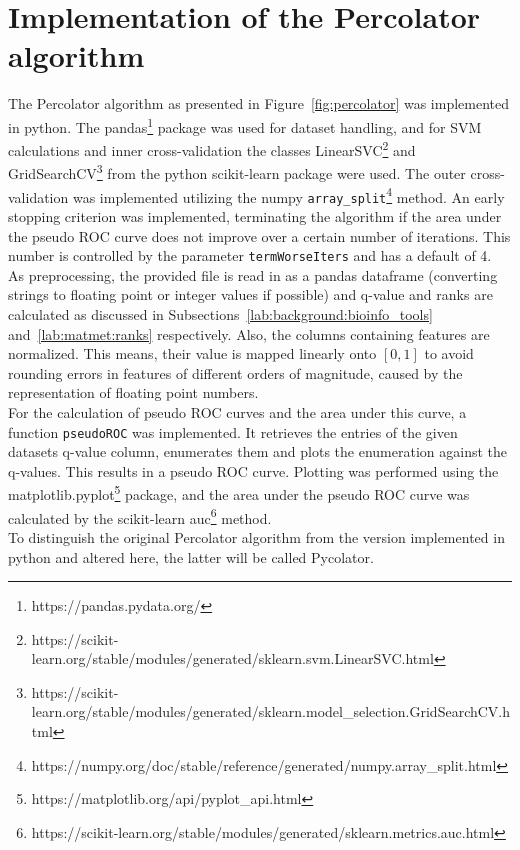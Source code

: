\section{Implementation of the Percolator algorithm}
The Percolator algorithm as presented in Figure~\ref{fig:percolator} was implemented in python. The pandas\footnote{https://pandas.pydata.org/} package was used for dataset handling, and for SVM calculations and inner cross-validation the classes LinearSVC\footnote{https://scikit-learn.org/stable/modules/generated/sklearn.svm.LinearSVC.html} and GridSearchCV\footnote{https://scikit-learn.org/stable/modules/generated/sklearn.model\_selection.GridSearchCV.html} from the python scikit-learn package were used. The outer cross-validation was implemented utilizing the numpy \texttt{array\_split}\footnote{https://numpy.org/doc/stable/reference/generated/numpy.array\_split.html} method. An early stopping criterion was implemented, terminating the algorithm if the area under the pseudo ROC curve does not improve over a certain number of iterations. This number is controlled by the parameter \texttt{termWorseIters} and has a default of 4.\\
\label{lab:matmet:normalization}As preprocessing, the provided file is read in as a pandas dataframe (converting strings to floating point or integer values if possible) and q-value and ranks are calculated as discussed in Subsections~\ref{lab:background:bioinfo_tools} and~\ref{lab:matmet:ranks} respectively. Also, the columns containing features are normalized. This means, their value is mapped linearly onto $[0,1]$ to avoid rounding errors in features of different orders of magnitude, caused by the representation of floating point numbers.\\
\label{lab:matmet:pseudoROC}For the calculation of pseudo ROC curves and the area under this curve, a function \texttt{pseudoROC} was implemented. It retrieves the entries of the given datasets q-value column, enumerates them and plots the enumeration against the q-values. This results in a pseudo ROC curve. Plotting was performed using the matplotlib.pyplot\footnote{https://matplotlib.org/api/pyplot\_api.html} package, and the area under the pseudo ROC curve was calculated by the scikit-learn auc\footnote{https://scikit-learn.org/stable/modules/generated/sklearn.metrics.auc.html} method.\\
To distinguish the original Percolator algorithm from the version implemented in python and altered here, the latter will be called Pycolator.

